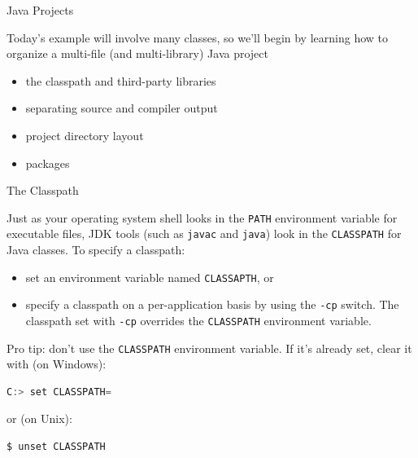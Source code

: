 \documentclass{beamer}
\author[Chris Simpkins]
{Christopher Simpkins \\\texttt{chris.simpkins@gatech.edu}}
\institute[Georgia Tech] %
\date[CS 1331]{}
\begin{document}
\begin{frame}
  \titlepage
\end{frame}

\begin{frame}[fragile]{Java Projects}

Today's example will involve many classes, so we'll begin by learning how to organize a multi-file (and multi-library) Java project
\begin{itemize}
  \item the classpath and third-party libraries
  \item separating source and compiler output
  \item project directory layout
  \item packages
\end{itemize}

\end{frame}

\begin{frame}[fragile]{The Classpath}


Just as your operating system shell looks in the {\tt PATH} environment variable for executable files, JDK tools (such as {\tt javac} and {\tt java}) look in the {\tt CLASSPATH} for Java classes. To specify a classpath:

\begin{itemize}
\item set an environment variable named {\tt CLASSAPTH}, or
\item specify a classpath on a per-application basis by using the {\tt -cp} switch.  The classpath set with {\tt -cp} overrides the {\tt CLASSPATH} environment variable.
\end{itemize}
Pro tip: don't use the {\tt CLASSPATH} environment variable.  If it's already set, clear it with (on Windows):
\begin{lstlisting}[language=Java]
C:> set CLASSPATH=
\end{lstlisting}
or (on Unix):
\begin{lstlisting}[language=Java]
$ unset CLASSPATH
\end{lstlisting}

\end{frame}
\end{document}
